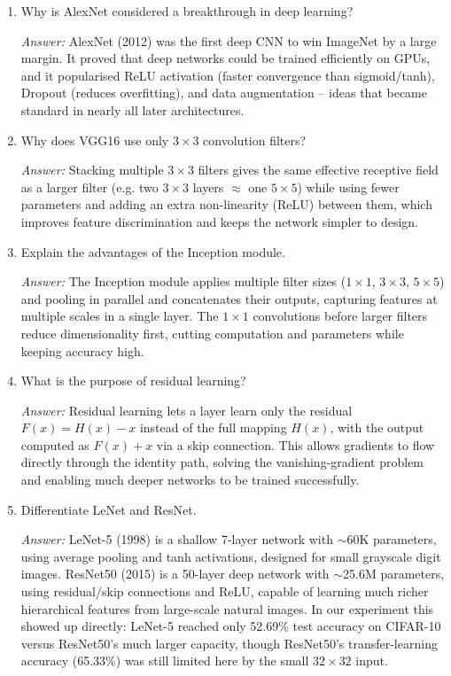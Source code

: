 \documentclass[11pt]{article}
\begin{document}
\begin{enumerate}

\item Why is AlexNet considered a breakthrough in deep learning?

\textit{Answer:} AlexNet (2012) was the first deep CNN to win ImageNet by a large margin. It proved that deep networks could be trained efficiently on GPUs, and it popularised ReLU activation (faster convergence than sigmoid/tanh), Dropout (reduces overfitting), and data augmentation -- ideas that became standard in nearly all later architectures.

\item Why does VGG16 use only $3\times3$ convolution filters?

\textit{Answer:} Stacking multiple $3\times3$ filters gives the same effective receptive field as a larger filter (e.g. two $3\times3$ layers $\approx$ one $5\times5$) while using fewer parameters and adding an extra non-linearity (ReLU) between them, which improves feature discrimination and keeps the network simpler to design.

\item Explain the advantages of the Inception module.

\textit{Answer:} The Inception module applies multiple filter sizes ($1\times1$, $3\times3$, $5\times5$) and pooling in parallel and concatenates their outputs, capturing features at multiple scales in a single layer. The $1\times1$ convolutions before larger filters reduce dimensionality first, cutting computation and parameters while keeping accuracy high.

\item What is the purpose of residual learning?

\textit{Answer:} Residual learning lets a layer learn only the residual $F(x) = H(x) - x$ instead of the full mapping $H(x)$, with the output computed as $F(x)+x$ via a skip connection. This allows gradients to flow directly through the identity path, solving the vanishing-gradient problem and enabling much deeper networks to be trained successfully.

\item Differentiate LeNet and ResNet.

\textit{Answer:} LeNet-5 (1998) is a shallow 7-layer network with $\sim$60K parameters, using average pooling and tanh activations, designed for small grayscale digit images. ResNet50 (2015) is a 50-layer deep network with $\sim$25.6M parameters, using residual/skip connections and ReLU, capable of learning much richer hierarchical features from large-scale natural images. In our experiment this showed up directly: LeNet-5 reached only 52.69\% test accuracy on CIFAR-10 versus ResNet50's much larger capacity, though ResNet50's transfer-learning accuracy (65.33\%) was still limited here by the small $32\times32$ input.


\end{enumerate}
\end{document}
